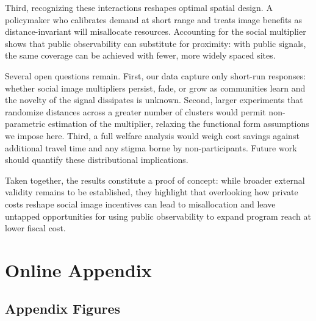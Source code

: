 \documentclass[12pt,a4paper]{article}
\begin{document}
Third, recognizing these interactions reshapes optimal spatial design. A policymaker who calibrates demand at short range and treats image benefits as distance-invariant will misallocate resources. Accounting for the social multiplier shows that public observability can substitute for proximity: with public signals, the same coverage can be achieved with fewer, more widely spaced sites.

Several open questions remain. First, our data capture only short-run responses: whether social image multipliers persist, fade, or grow as communities learn and the novelty of the signal dissipates is unknown. Second, larger experiments that randomize distances across a greater number of clusters would permit non-parametric estimation of the multiplier, relaxing the functional form assumptions we impose here. Third, a full welfare analysis would weigh cost savings against additional travel time and any stigma borne by non-participants. Future work should quantify these distributional implications.

Taken together, the results constitute a proof of concept: while broader external validity remains to be established, they highlight that overlooking how private costs reshape social image incentives can lead to misallocation and leave untapped opportunities for using public observability to expand program reach at lower fiscal cost.



\newpage 





\clearpage
\appendix
\FloatBarrier

\setcounter{table}{0}
\renewcommand{\thetable}{A\arabic{table}}

\setcounter{figure}{0}
\renewcommand{\thefigure}{A\arabic{figure}}


\renewcommand{\thesubsection}{\Alph{subsection}}

\section{Online Appendix}

\subsection{Appendix Figures}
\end{document}
